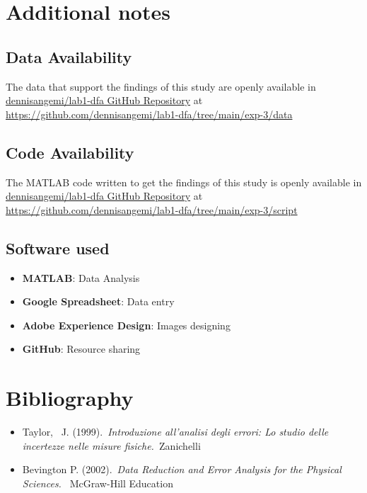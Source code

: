 \documentclass[10pt,a4paper]{article}
\begin{document}
\section{Additional notes}

\subsection{Data Availability}
The data that support the findings of this study are openly available in \href{https://github.com/dennisangemi/lab1-dfa/tree/main/exp-3/data}{dennisangemi/lab1-dfa GitHub Repository} at \href{https://github.com/dennisangemi/lab1-dfa/tree/main/exp-3/data}{https://github.com/dennisangemi/lab1-dfa/tree/main/exp-3/data}

\subsection{Code Availability}
The MATLAB code written to get the findings of this study is openly available in \href{https://github.com/dennisangemi/lab1-dfa/tree/main/exp-2/script}{dennisangemi/lab1-dfa GitHub Repository} at \href{https://github.com/dennisangemi/lab1-dfa/tree/main/exp-3/script}{https://github.com/dennisangemi/lab1-dfa/tree/main/exp-3/script}


\subsection{Software used}
\begin{itemize}
\item
  \textbf{MATLAB}: Data Analysis
\item
  \textbf{Google Spreadsheet}: Data entry
\item
  \textbf{Adobe Experience Design}: Images designing
\item
  \textbf{GitHub}: Resource sharing
\end{itemize}

\section{Bibliography}
\begin{itemize}
\item
  Taylor,~ J. (1999).~\emph{Introduzione all'analisi degli errori: Lo
  studio delle incertezze nelle misure fisiche.~}Zanichelli
\item
  Bevington P. (2002).~\emph{Data Reduction and Error Analysis for the
  Physical Sciences.~} McGraw-Hill Education ~
\end{itemize}
\end{document}

